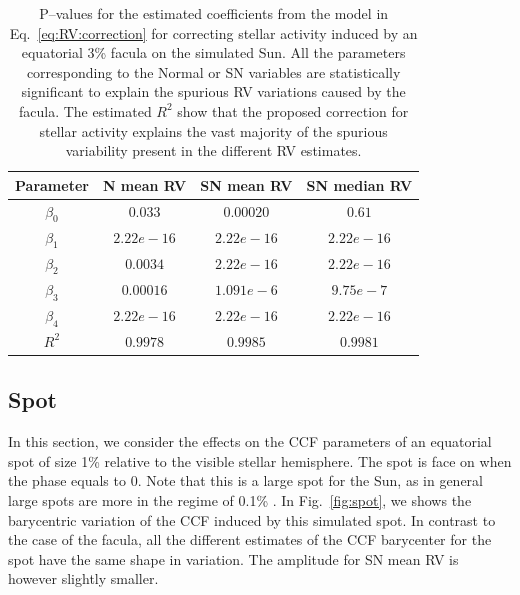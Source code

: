 \documentclass{aa}
\begin{document}
\begin{table}
\begin{center}
\caption{P--values for the estimated coefficients from the model in Eq.~\ref{eq:RV:correction} for correcting stellar activity induced by an equatorial 3\% facula on the simulated Sun. All the parameters corresponding to the Normal or SN variables are statistically significant to explain the spurious RV variations caused by the facula. The estimated $R^{2}$ show that the proposed correction for stellar activity explains the vast majority of the spurious variability present in the different RV estimates.}
\label{table:faculae.test}
\begin{tabular}{|c|c|c|c|}
\hline
Parameter          & N mean RV         &   SN mean RV &   SN median RV \\
\hline
$\beta_{0}$            &    $0.033$    & $0.00020$ & $0.61$ \\
\hline
$\beta_{1}$            &    $2.22e-16 $    & $2.22e-16 $ & $2.22e-16 $ \\
\hline
$\beta_{2}$            &     $0.0034$   &  $2.22e-16 $ & $2.22e-16 $\\
\hline
$\beta_{3}$            &     $0.00016$   &  $1.091e-6$ & $9.75e-7$\\
\hline
$\beta_{4}$            &     $2.22e-16$   &  $2.22e-16$ & $2.22e-16$\\
\hline
$R^{2}$      &     $0.9978$    &  $0.9985$ & $0.9981$  \\
\hline
\end{tabular}
\end{center}
\end{table}

\subsection{Spot} \label{sec:soap.spot}

In this section, we consider the effects on the CCF parameters of an equatorial spot of size 1\% relative to the visible stellar hemisphere. The spot is face on when the phase equals to 0. Note that this is a large spot for the Sun, as in general large spots are more in the regime of 0.1\% \citep[e.g.][]{Borgniet-2015}. In Fig.~\ref{fig:spot}, we shows the barycentric variation of the CCF induced by this simulated spot. In contrast to the case of the facula, all the different estimates of the CCF barycenter for the spot have the same shape in variation. The amplitude for SN mean RV is however slightly smaller.
\end{document}
